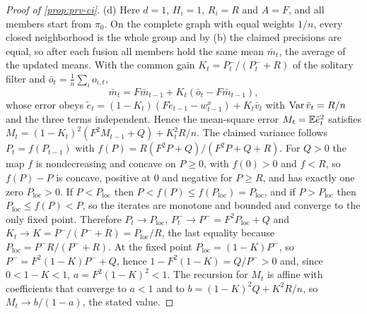 \begin{proof}[Proof of \cref{prop:prv-ci}]
(d) Here $d=1$, $H_i=1$, $R_i=R$ and $A=F$, and all members start from $\pi_0$. On the complete graph with equal weights $1/n$, every closed neighborhood is the whole group and by (b) the claimed precisions are equal, so after each fusion all members hold the same mean $\bar m_t$, the average of the updated means. With the common gain $K_t=P^-_t/(P^-_t+R)$ of the solitary filter and $\bar o_t=\frac1n\sum_io_{i,t}$,
\[
\bar m_t=F\bar m_{t-1}+K_t(\bar o_t-F\bar m_{t-1}),
\]
whose error obeys $\tilde e_t=(1-K_t)(F\tilde e_{t-1}-w^x_{t-1})+K_t\bar v_t$ with $\operatorname{Var}\bar v_t=R/n$ and the three terms independent. Hence the mean-square error $M_t=\mathbb{E}\tilde e_t^2$ satisfies $M_t=(1-K_t)^2(F^2M_{t-1}+Q)+K_t^2R/n$. The claimed variance follows $P_t=f(P_{t-1})$ with $f(P)=R(F^2P+Q)/(F^2P+Q+R)$. For $Q>0$ the map $f$ is nondecreasing and concave on $P\ge0$, with $f(0)>0$ and $f<R$, so $f(P)-P$ is concave, positive at $0$ and negative for $P\ge R$, and has exactly one zero $P_{\mathrm{loc}}>0$. If $P<P_{\mathrm{loc}}$ then $P<f(P)\le f(P_{\mathrm{loc}})=P_{\mathrm{loc}}$, and if $P>P_{\mathrm{loc}}$ then $P_{\mathrm{loc}}\le f(P)<P$, so the iterates are monotone and bounded and converge to the only fixed point. Therefore $P_t\to P_{\mathrm{loc}}$, $P^-_t\to P^-=F^2P_{\mathrm{loc}}+Q$ and $K_t\to K=P^-/(P^-+R)=P_{\mathrm{loc}}/R$, the last equality because $P_{\mathrm{loc}}=P^-R/(P^-+R)$. At the fixed point $P_{\mathrm{loc}}=(1-K)P^-$, so $P^-=F^2(1-K)P^-+Q$, hence $1-F^2(1-K)=Q/P^->0$ and, since $0<1-K<1$, $a=F^2(1-K)^2<1$. The recursion for $M_t$ is affine with coefficients that converge to $a<1$ and to $b=(1-K)^2Q+K^2R/n$, so $M_t\to b/(1-a)$, the stated value.
\end{proof}

